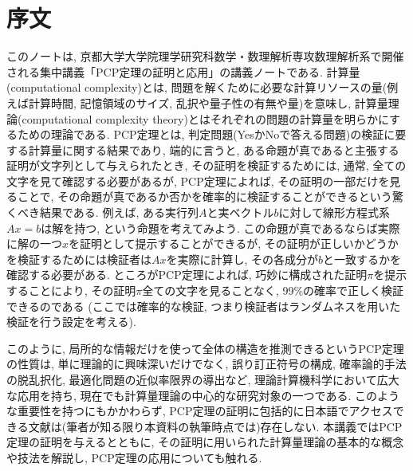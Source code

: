 \chapter*{序文}



このノートは, 京都大学大学院理学研究科数学・数理解析専攻数理解析系で開催される集中講義「PCP定理の証明と応用」の講義ノートである.
計算量(computational complexity)とは, 問題を解くために必要な計算リソースの量(例えば計算時間, 記憶領域のサイズ, 乱択や量子性の有無や量)を意味し, 計算量理論(computational complexity theory)とはそれぞれの問題の計算量を明らかにするための理論である.
PCP定理とは, 判定問題(YesかNoで答える問題)の検証に要する計算量に関する結果であり,
端的に言うと, ある命題が真であると主張する証明が文字列として与えられたとき,
その証明を検証するためには, 通常, 全ての文字を見て確認する必要があるが,
PCP定理によれば, その証明の一部だけを見ることで, その命題が真であるか否かを確率的に検証することができるという驚くべき結果である.
例えば, ある実行列$A$と実ベクトル$b$に対して線形方程式系$Ax=b$は解を持つ, という命題を考えてみよう.
この命題が真であるならば実際に解の一つ$x$を証明として提示することができるが, その証明が正しいかどうかを検証するためには検証者は$Ax$を実際に計算し, その各成分が$b$と一致するかを確認する必要がある.
ところがPCP定理によれば, 巧妙に構成された証明$\pi$を提示することにより, その証明$\pi$全ての文字を見ることなく, 99\%の確率で正しく検証できるのである (ここでは確率的な検証, つまり検証者はランダムネスを用いた検証を行う設定を考える).

このように, 局所的な情報だけを使って全体の構造を推測できるというPCP定理の性質は, 単に理論的に興味深いだけでなく, 誤り訂正符号の構成, 確率論的手法の脱乱択化, 最適化問題の近似率限界の導出など, 理論計算機科学において広大な応用を持ち, 現在でも計算量理論の中心的な研究対象の一つである.
このような重要性を持つにもかかわらず, PCP定理の証明に包括的に日本語でアクセスできる文献は(筆者が知る限り本資料の執筆時点では)存在しない.
本講義ではPCP定理の証明を与えるとともに, その証明に用いられた計算量理論の基本的な概念や技法を解説し,
PCP定理の応用についても触れる.

